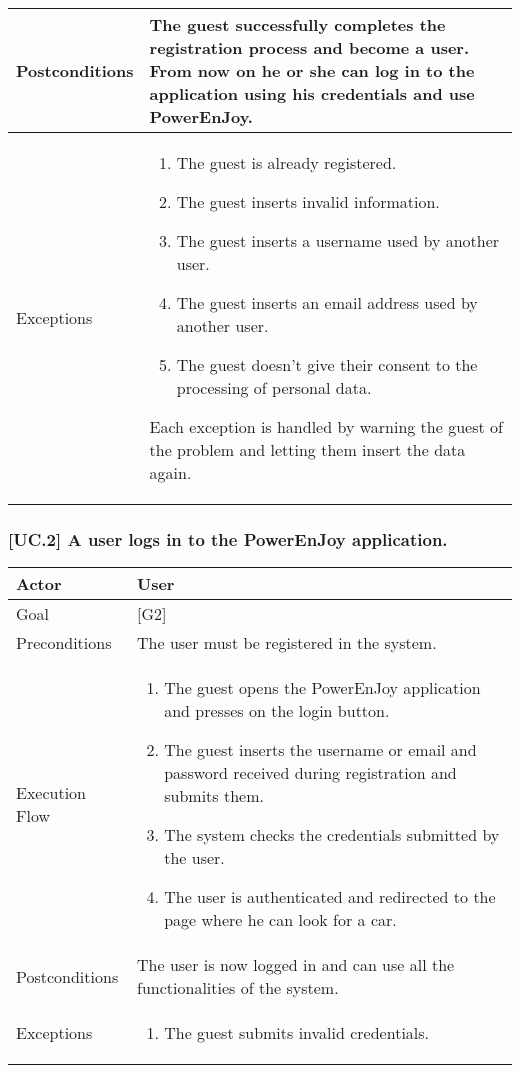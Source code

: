 \documentclass[english]{article}
\begin{document}
	\begin{tabularx}{\textwidth}{  l  X  }
		\hline
		Postconditions & The guest successfully completes the registration process and become a user. From now on he or she can log in to the application using his credentials and use PowerEnJoy.\\
		\hline
		Exceptions & \begin{enumerate}
			\item{The guest is already registered.}
			\item{The guest inserts invalid information.}
			\item{The guest inserts a username used by another user.}
			\item{The guest inserts an email address used by another user.}
			\item{The guest doesn't give their consent to the processing of personal data.}
		\end{enumerate}
		Each exception is handled by warning the guest of the problem and letting them insert the data again.\\
		\hline
	\end{tabularx}
	
	\subsubsection{[UC.2] A user logs in to the PowerEnJoy application.}
	\begin{tabularx}{\textwidth}{  l  X  }
		\hline
		Actor & User\\
		\hline
		Goal & [G2]\\
		\hline
		Preconditions & The user must be registered in the system.\\
		\hline
		Execution Flow & \begin{enumerate}
			\item{The guest opens the PowerEnJoy application and presses on the login button.}
			\item{The guest inserts the username or email and password received during registration and submits them.}
			\item{The system checks the credentials submitted by the user.}
			\item{The user is authenticated and redirected to the page where he can look for a car.}
		\end{enumerate}\\
		\hline
		Postconditions & The user is now  logged in and can use all the functionalities of the system.\\
		\hline
		Exceptions & \begin{enumerate}
			\item{The guest submits invalid credentials.}
		\end{enumerate}\\
		\hline
	\end{tabularx}
	
\end{document}
